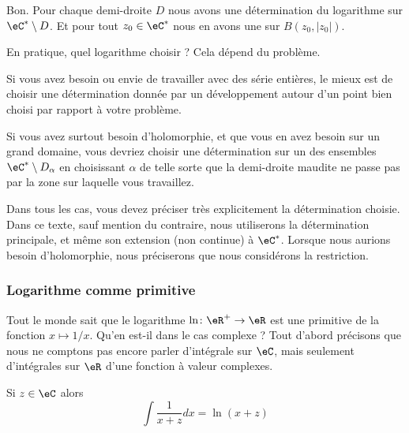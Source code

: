Bon. Pour chaque demi-droite \( D\) nous avons une détermination du logarithme sur \( \eC^*\setminus D\). Et pour tout \( z_0\in \eC^*\) nous en avons une sur \( B(z_0,| z_0 |)\).

En pratique, quel logarithme choisir ? Cela dépend du problème.

Si vous avez besoin ou envie de travailler avec des série entières, le mieux est de choisir une détermination donnée par un développement autour d'un point bien choisi par rapport à votre problème.

Si vous avez surtout besoin d'holomorphie, et que vous en avez besoin sur un grand domaine, vous devriez choisir une détermination sur un des ensembles \( \eC^*\setminus D_{\alpha}\) en choisissant \( \alpha\) de telle sorte que la demi-droite maudite ne passe pas par la zone sur laquelle vous travaillez.

Dans tous les cas, vous devez préciser très explicitement la détermination choisie. Dans ce texte, sauf mention du contraire, nous utiliserons la détermination principale, et même son extension (non continue) à \( \eC^*\). Lorsque nous aurions besoin d'holomorphie, nous préciserons que nous considérons la restriction.

\subsubsection{Logarithme comme primitive}

Tout le monde sait que le logarithme \( \ln\colon \eR^+\to \eR\) est une primitive de la fonction \( x\mapsto 1/x\). Qu'en est-il dans le cas complexe ? Tout d'abord précisons que nous ne comptons pas encore parler d'intégrale sur \( \eC\), mais seulement d'intégrales sur \( \eR\) d'une fonction à valeur complexes.

\begin{proposition}     \label{PROPooNIJVooKueuYJ}
	Si \( z\in \eC\) alors
	\begin{equation}        \label{EQooAHYXooTPGXDS}
		\int\frac{1}{ x+z }dx=\ln(x+z)
	\end{equation}
\end{proposition}

